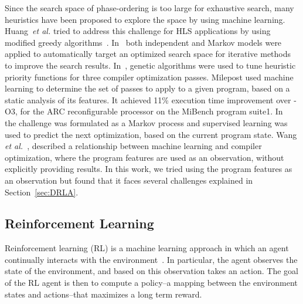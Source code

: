 Since the search space of phase-ordering is too large for exhaustive search, many heuristics have been proposed to explore the space by using machine learning. 
Huang~\textit{et al.} tried to address this challenge for HLS applications by using modified greedy algorithms~\cite{huang2013effect}\cite{huang2015effect}. %
In~\cite{agakov2006using} both independent and Markov models were applied to automatically target an optimized search space for iterative methods to improve the search results.
In~\cite{2003Stephenson}, genetic algorithms were used to tune heuristic priority functions for three compiler optimization passes. 
Milepost\cite{fursin2011milepost} used machine learning to determine the set of passes to apply to a given program, based on a static analysis of its features. It achieved 11\% execution time improvement over -O3, for the ARC reconfigurable processor on the MiBench program suite1.
In~\cite{2012Kulkarni} the challenge was formulated as a Markov process and supervised learning was used to predict the next optimization, based on the current program state.
Wang \textit{et al.}~\cite{wang2018}, described a relationship between machine learning and compiler optimization, where the program features are used as an observation, without explicitly providing results. In this work, we tried using the program features as an observation but found that it faces several challenges explained in Section~\ref{sec:DRLA}.
\subsection{Reinforcement Learning}

Reinforcement learning (RL) is a machine learning approach in which an agent continually interacts with the environment~\cite{kaelbling1996reinforcement}. In particular, the agent observes the state of the environment, and based on this observation takes an action. The goal of the RL agent is then to compute a policy--a mapping between the environment states and actions--that maximizes a long term reward. 


